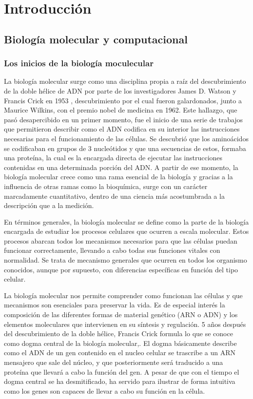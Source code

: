 
\chapter{Introducción}


\section{Biología molecular y computacional}


\subsection{Los inicios de la biología moculecular}

La biología molecular surge como una disciplina propia a raíz del descubrimiento de la doble hélice de ADN por parte de los investigadores James D. Watson y Francis Crick en 1953 \cite{watsonycrick}, descubrimiento por el cual fueron galardonados, junto a Maurice Wilkins, con el premio nobel de medicina en 1962. Este hallazgo, que pasó desapercibido en un primer momento, fue el inicio de una serie de trabajos que permitieron describir como el ADN codifica en su interior las instrucciones necesarias para el funcionamiento de las células. Se descubrió que los aminoácidos se codificaban en grupos de 3 nucleótidos y que una secuencias de estos, formaba una proteína, la cual es la encargada directa de ejecutar las instrucciones contenidas en una determinada porción del ADN. A partir de ese momento, la biología molecular crece como una rama esencial de la biología y gracias a la influencia de otras ramas como la bioquímica, surge con un carácter marcadamente cuantitativo, dentro de una ciencia más acostumbrada a la descripción que a la medición.

\medskip

En términos generales, la biología molecular se define como la parte de la biología encargada de estudiar los procesos celulares que ocurren a escala molecular. Estos procesos abarcan todos los mecanismos necesarios para que las células puedan funcionar correctamente, llevando a cabo todas sus funciones vitales con normalidad. Se trata de mecanismo generales que ocurren en todos los organismo conocidos, aunque por supuesto, con diferencias específicas en función del tipo celular.

\medskip

La biología molecular nos permite comprender como funcionan las células y que mecanismos son esenciales para preservar la vida. Es de especial interés la composición de las diferentes formas de material genético (ARN o ADN) y los elementos moleculares que intervienen en su síntesis y regulación. 
5 años después del descubrimiento de la doble hélice, Francis Crick formula lo que se conoce como dogma central de la biología molecular,. El dogma básicamente describe como el ADN de un gen contenido en el nucleo celular se trascribe a un ARN mensajero que sale del núcleo, y que posteriormente será traducido a una proteína que llevará a cabo la función del gen. A pesar de que con el tiempo el dogma central se ha desmitificado, ha servido para ilustrar de forma intuitiva como los genes son capaces de llevar a cabo su función en la célula. 


